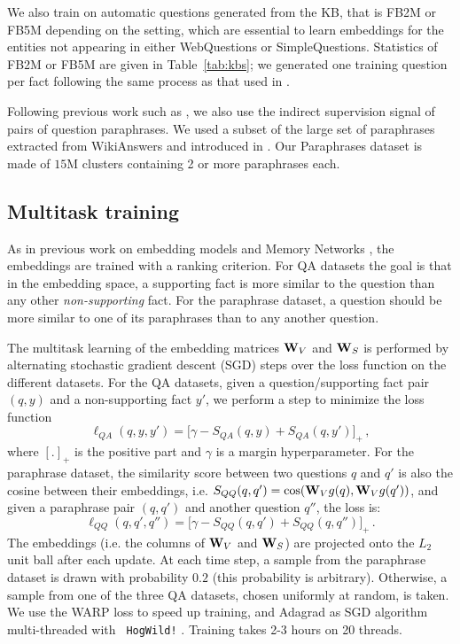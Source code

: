 \documentclass[11pt,a4paper]{article}
\newcommand{\wq}{{\sf WebQuestions}\xspace}
\newcommand{\fbq}{{\sf SimpleQuestions}\xspace}
\newcommand{\fbs}{{\sf FB2M}\xspace}
\newcommand{\fbb}{{\sf FB5M}\xspace}
\newcommand{\prp}{{\sf Paraphrases}\xspace}
\newcommand{\wk}{{\sc WikiAnswers}\xspace}
\newcommand{\phiq}{g}
\newcommand{\fact}{y}
\newcommand{\ques}{q}
\newcommand{\score}{S}
\begin{document}
We also train on automatic questions generated from the KB, that is
\fbs or \fbb depending on the setting, which are essential to learn
embeddings for the entities not appearing in either \wq or \fbq.
Statistics of \fbs or \fbb are given in Table~\ref{tab:kbs}; we
generated one training question per fact following the same process 
as that used in \cite{bordes-chopra-weston:2014:EMNLP2014}.

Following previous work such as \cite{paralex}, we also use
the indirect supervision signal of pairs of question paraphrases.
We used a subset of the large set of paraphrases extracted
from \wk and introduced in \cite{fader2014open}.
Our \prp dataset is made of $15$M clusters containing 2 or more
paraphrases each.

\subsection{Multitask training}

As in previous work on embedding models and Memory Networks
\cite{bordes-chopra-weston:2014:EMNLP2014,bordes2014open,weston2014memory},
the embeddings are trained with a ranking criterion. For QA datasets the
goal is that in the embedding space, a supporting fact is more similar to
the question than any other {\it non-supporting} fact. For the paraphrase dataset, a
question should be more similar to one of its paraphrases than to any
another question.

The multitask learning of the embedding matrices ${\bf W}_V$ and ${\bf
  W}_S$ is performed by alternating stochastic gradient descent (SGD)
steps over the loss function on the different datasets. For the QA
datasets, given a question/supporting fact pair $(\ques, \fact)$ and a
non-supporting fact $\fact'$, we perform a step to minimize the loss function
\begin{equation*}
\ell_{QA}(\ques, \fact, \fact') = \big[\gamma - \score_{QA}(\ques, \fact) + \score_{QA}(\ques, \fact') \big]_+\,,
\end{equation*}
where $[.]_+$ is the positive part and $\gamma$ is a margin
hyperparameter. For the paraphrase dataset, the similarity score
between two questions $\ques$ and $\ques'$ is also the cosine between
their embeddings, i.e. $\score_{QQ}(\ques, \ques') = \cos({\bf W}_V
\phiq(\ques), {\bf W}_{V}\phiq(\ques'))$, and given a paraphrase pair
$(\ques, \ques')$ and another question $\ques''$, the loss is:
\begin{equation*}
\ell_{QQ}(\ques, \ques', \ques'') = \big[\gamma - \score_{QQ}(\ques, \ques') + \score_{QQ}(\ques, \ques'') \big]_+\,.
\end{equation*}
The embeddings (i.e. the columns of ${\bf W}_V$ and ${\bf W}_S$) are
projected onto the $L_2$ unit ball after each update.
At each time step, a sample from the paraphrase dataset is drawn with
probability $0.2$ (this probability is arbitrary). Otherwise, a sample from one of the three
QA datasets, chosen uniformly at random, is taken. We use the WARP loss
\cite{wsabie} to speed up training, and Adagrad
\cite{duchi2011adaptive} as SGD algorithm multi-threaded with {\tt
  HogWild!} \cite{recht2011hogwild}.
Training takes 2-3 hours on 20 threads. 
\end{document}
